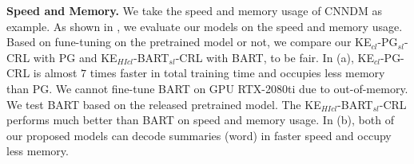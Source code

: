 \textbf{Speed and Memory.}
We take the speed and memory usage of CNNDM as example.
As shown in , we evaluate our models on the speed and memory usage.
Based on fune-tuning on the pretrained model or not, 
we compare our KE$_{cl}$-PG$_{sl}$-CRL with PG
and KE$_{HIcl}$-BART$_{sl}$-CRL with BART, to be fair.
In (a), 
KE$_{cl}$-PG-CRL is almost $7$ times faster in total training time and occupies less memory than PG.
We cannot fine-tune BART on GPU RTX-2080ti due to out-of-memory.
We test BART based on the released pretrained model.
The KE$_{HIcl}$-BART$_{sl}$-CRL performs much better than BART on speed and memory usage.
In (b),
both of our proposed models can decode summaries (word) in faster speed
and occupy less memory.
\begin{table}[th]
\centering
\small
{}
\qquad
{}
\caption{Total time (T), speed and memory usage (M) of models during training and testing of CNNDM dataset
         on RTX-2080ti.} 
\label{tab:eval_speed}
\end{table}

